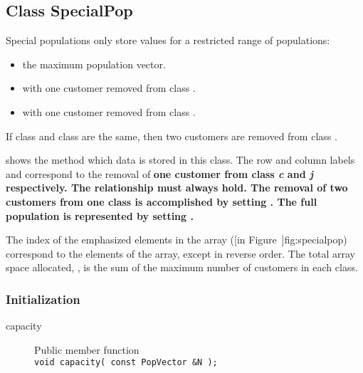 \subsection{Class SpecialPop}
\label{sec:special-population}

Special populations only store values for a restricted range of
populations:
\begin{itemize}
\item the maximum population vector.
\item with one customer removed from class .
\item with one customer removed from class .
\end{itemize}
If class  and class  are the same, then two customers
are removed from class .  

 shows
the method which data is stored in this class.  The row and column
labels  and  correspond to the removal of \bf{one}
customer from class \emph{c} and \emph{j} respectively.  The
relationship  must always hold.  The removal
of two customers from one class is accomplished by setting
.  The full population is represented
by setting .

\begin{figure}[htbp]
  \label{fig:specialpop}
  \begin{center}
  \end{center}
\end{figure}

The index of the emphasized elements in the array ([in Figure~\Ref]{fig:specialpop}) correspond to the elements
of the  array, except in
reverse order.  The total array space allocated,
, is the sum of the maximum
number of customers in each class.

\subsubsection{Initialization}
\begin{description}
\item[capacity] \texonly{---} Public member function\\
  \texttt{void capacity( const PopVector \&N );}
\end{description}

